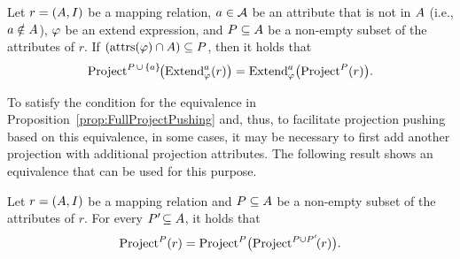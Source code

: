 \vspace{-1mm} %

\begin{proposition}
	\label{prop:FullProjectPushing}
	\normalfont
	Let $r = (A, I)$ be a mapping relation,
	$a \in \mathcal{A}$ be an attribute
		that is not in $A$ (i.e., $a \notin A$),
	$\varphi$ be an extend expression, and
	$P \subseteq A$ be a non-empty subset of the attributes of $r$.
	If $( \mathrm{attrs}(\varphi) \cap A ) \subseteq P$, then it holds that%
%
\vspace{-2mm} %
%
	\begin{equation*}
		\text{Project}^{P \,\cup\, \{a\}\!}\bigl( \text{Extend}_{\varphi}^{a}(r) \bigr)
		=
		\text{Extend}_{\varphi}^{a}\bigl( \text{Project}^{P}(r) \bigr)
		.
	\end{equation*}
\end{proposition}

\vspace{-1mm} %

To satisfy the condition for the equivalence in Proposition~\ref{prop:FullProjectPushing} and, thus, to facilitate projection pushing based on this equivalence, in some cases, it may be necessary to first add another projection with additional projection attributes. The following result shows an equivalence that can be used for this purpose.

\vspace{-1mm} %

\begin{proposition}
	\label{prop:ProjectSplitting}
	\normalfont
	Let $r = (A, I)$ be a mapping relation and
	$P \subseteq A$ be a non-empty subset of the attributes of $r$.
	For every $P'\! \subseteq A$, it holds that%
%
\vspace{-2mm} %
%
	\begin{equation*}
		\text{Project}^{P}(r)
		=
		\text{Project}^{P}\bigl( \text{Project}^{P\cup P'\!}(r) \bigr)
		.
	\end{equation*}
\end{proposition}

\vspace{-1mm} %

